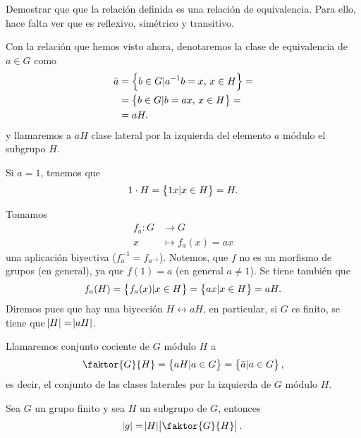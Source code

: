 \begin{ej}
    Demostrar que que la relación definida es una relación de equivalencia. Para ello, hace falta ver que es
    reflexivo, simétrico y transitivo.
\end{ej}

\begin{defi}
    Con la relación que hemos visto ahora, denotaremos la clase de equivalencia de $a \in G$ como
    \[
        \begin{aligned}
            \bar{a} &= \left\{b \in G \vert a^{-1}b = x, \, x \in H\right\} =\\ &=
            \left\{b \in G \vert b = ax, \, x \in H\right\} =\\&= aH.
        \end{aligned}
    \]
    y llamaremos a $aH$ clase lateral por la izquierda del elemento $a$ módulo el subgrupo $H$.
\end{defi}

\begin{example}
    Si $a = 1$, tenemos que
    \[
        1\cdot H = \left\{1x \vert x \in H\right\} = H.
    \]
\end{example}

\begin{obs}
    Tomamos
    \[
        \begin{aligned}
            f_a \colon G &\to G \\
            x &\mapsto f_a(x) = ax
        \end{aligned}
    \]
    una aplicación biyectiva ($f^{-1}_a = f_{a^{-1}}$). Notemos, que $f$ no es un morfismo
    de grupos (en general), ya que $f(1) = a$ (en general $a \neq 1$). Se tiene también que
    \[
        f_a(H) = \left\{f_a(x) \vert x \in H\right\} = \left\{ax \vert x \in H\right\} = aH.
    \]
    Diremos pues que hay una biyección $H \leftrightarrow aH$, en particular, si $G$ es finito, se tiene que
    $\abs{H} = \abs{aH}$.
\end{obs}

\begin{defi}
    Llamaremos conjunto cociente de $G$ módulo $H$ a 
    \[
        \faktor{G}{H} = \setb{aH \vert a \in G} = \setb{ \bar{a} \vert a \in G},
    \]
    es decir, el conjunto de las clases laterales por la izquierda de $G$ módulo $H$.
    
\end{defi}

\begin{teo}[de Lagrange]
    Sea $G$ un grupo finito y sea $H$ un subgrupo de $G$, entonces
    \[
        \abs{g} = \abs{H} \abs{\faktor{G}{H}}.
    \]
\end{teo}

